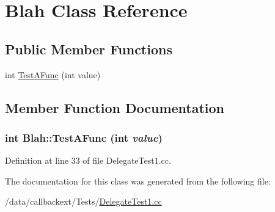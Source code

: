 \hypertarget{classBlah}{
\section{Blah Class Reference}
\label{classBlah}
}
\subsection*{Public Member Functions}
\begin{CompactItemize}
\item 
int \hyperlink{classBlah_a0}{Test\-AFunc} (int value)
\end{CompactItemize}


\subsection{Member Function Documentation}
\hypertarget{classBlah_a0}{
\subsubsection[TestAFunc]{\setlength{\rightskip}{0pt plus 5cm}int Blah::Test\-AFunc (int {\em value})}}
\label{classBlah_a0}




Definition at line 33 of file Delegate\-Test1.cc.

The documentation for this class was generated from the following file:\begin{CompactItemize}
\item 
/data/callbackext/Tests/\hyperlink{DelegateTest1_8cc}{Delegate\-Test1.cc}\end{CompactItemize}

